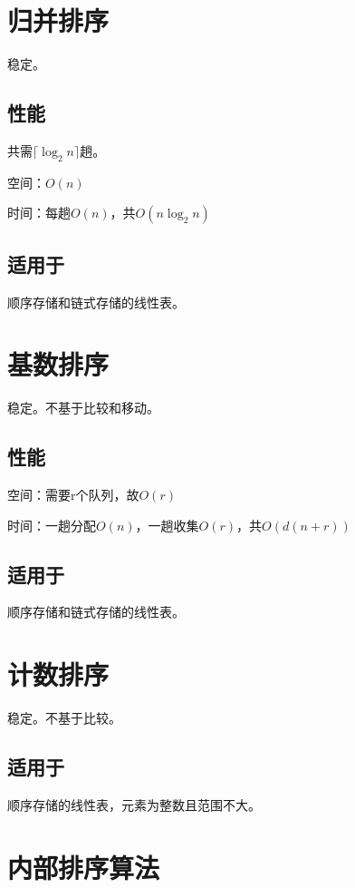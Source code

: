 \section{归并排序}
稳定。

\subsection{性能}
共需\(\lceil\log_2n\rceil\)趟。

空间：\(O(n)\)

时间：每趟\(O(n)\)，共\(O(n\log_2n)\)


\subsection{适用于}
顺序存储和链式存储的线性表。


\section{基数排序}
稳定。不基于比较和移动。

\subsection{性能}
空间：需要r个队列，故\(O(r)\)

时间：一趟分配\(O(n)\)，一趟收集\(O(r)\)，共\(O(d(n + r))\)


\subsection{适用于}
顺序存储和链式存储的线性表。


\section{计数排序}
稳定。不基于比较。

\subsection{适用于}
顺序存储的线性表，元素为整数且范围不大。


\section{内部排序算法}




